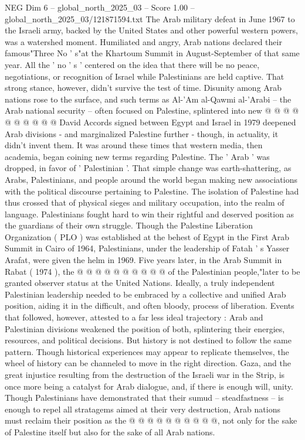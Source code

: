 \begin{textsample}{NEG Dim 6 – global\_north\_2025\_03 – Score 1.00 – global\_north\_2025\_03/121871594.txt}
The Arab military defeat in June 1967 to the Israeli army, backed by the United States and other powerful western powers, was a watershed moment.
Humiliated and angry, Arab nations declared their famous"Three No ' s"at the Khartoum Summit in August-September of that same year.
All the ' no ' s ' centered on the idea that there will be no peace, negotiations, or recognition of Israel while Palestinians are held captive.
That strong stance, however, didn't survive the test of time.
Disunity among Arab nations rose to the surface, and such terms as Al-'Am al-Qawmi al-'Arabi -- the Arab national security -- often focused on Palestine, splintered into new @ @ @ @ @ @ @ @ @ @ David Accords signed between Egypt and Israel in 1979 deepened Arab divisions - and marginalized Palestine further - though, in actuality, it didn't invent them.
It was around these times that western media, then academia, began coining new terms regarding Palestine.
The ' Arab ' was dropped, in favor of ' Palestinian '.
That simple change was earth-shattering, as Arabs, Palestinians, and people around the world began making new associations with the political discourse pertaining to Palestine.
The isolation of Palestine had thus crossed that of physical sieges and military occupation, into the realm of language.
Palestinians fought hard to win their rightful and deserved position as the guardians of their own struggle.
Though the Palestine Liberation Organization ( PLO ) was established at the behest of Egypt in the First Arab Summit in Cairo of 1964, Palestinians, under the leadership of Fatah ' s Yasser Arafat, were given the helm in 1969.
Five years later, in the Arab Summit in Rabat ( 1974 ), the @ @ @ @ @ @ @ @ @ @ of the Palestinian people,"later to be granted observer status at the United Nations.
Ideally, a truly independent Palestinian leadership needed to be embraced by a collective and unified Arab position, aiding it in the difficult, and often bloody, process of liberation.
Events that followed, however, attested to a far less ideal trajectory : Arab and Palestinian divisions weakened the position of both, splintering their energies, resources, and political decisions.
But history is not destined to follow the same pattern.
Though historical experiences may appear to replicate themselves, the wheel of history can be channeled to move in the right direction.
Gaza, and the great injustice resulting from the destruction of the Israeli war in the Strip, is once more being a catalyst for Arab dialogue, and, if there is enough will, unity.
Though Palestinians have demonstrated that their sumud -- steadfastness -- is enough to repel all stratagems aimed at their very destruction, Arab nations must reclaim their position as the @ @ @ @ @ @ @ @ @ @, not only for the sake of Palestine itself but also for the sake of all Arab nations.

\end{textsample}
